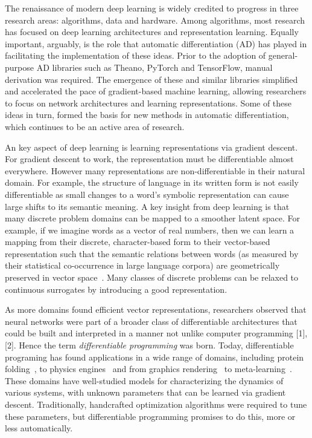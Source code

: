 \documentclass[12pt,initial,twoside,maitrise]{dms}
\numberwithin{equation}{section}
\numberwithin{table}{chapter}
\numberwithin{figure}{chapter}
\begin{document}
The renaissance of modern deep learning is widely credited to progress in three research areas: algorithms, data and hardware. Among algorithms, most research has focused on deep learning architectures and representation learning. Equally important, arguably, is the role that automatic differentiation (AD) has played in facilitating the implementation of these ideas. Prior to the adoption of general-purpose AD libraries such as Theano, PyTorch and TensorFlow, manual derivation was required. The emergence of these and similar libraries simplified and accelerated the pace of gradient-based machine learning, allowing researchers to focus on network architectures and learning representations. Some of these ideas in turn, formed the basis for new methods in automatic differentiation, which continues to be an active area of research.

An key aspect of deep learning is learning representations via gradient descent. For gradient descent to work, the representation must be differentiable almost everywhere. However many representations are non-differentiable in their natural domain. For example, the structure of language in its written form is not easily differentiable as small changes to a word's symbolic representation can cause large shifts to its semantic meaning. A key insight from deep learning is that many discrete problem domains can be mapped to a smoother latent space. For example, if we imagine words as a vector of real numbers, then we can learn a mapping from their discrete, character-based form to their vector-based representation such that the semantic relations between words (as measured by their statistical co-occurrence in large language corpora) are geometrically preserved in vector space~\cite{pennington2014glove}. Many classes of discrete problems can be relaxed to continuous surrogates by introducing a good representation.

As more domains found efficient vector representations, researchers observed that neural networks were part of a broader class of differentiable architectures that could be built and interpreted in a manner not unlike computer programming [1], [2]. Hence the term \textit{differentiable programming} was born. Today, differentiable programing has found applications in a wide range of domains, including protein folding~\cite{alquraishi2018end}, to physics engines~\cite{de2018end,DBLP:journals_corr_DegraveHDW16} and from graphics rendering~\cite{loper2014opendr} to meta-learning~\cite{liu2018darts}. These domains have well-studied models for characterizing the dynamics of various systems, with unknown parameters that can be learned via gradient descent. Traditionally, handcrafted optimization algorithms were required to tune these parameters, but differentiable programming promises to do this, more or less automatically.
\end{document}
